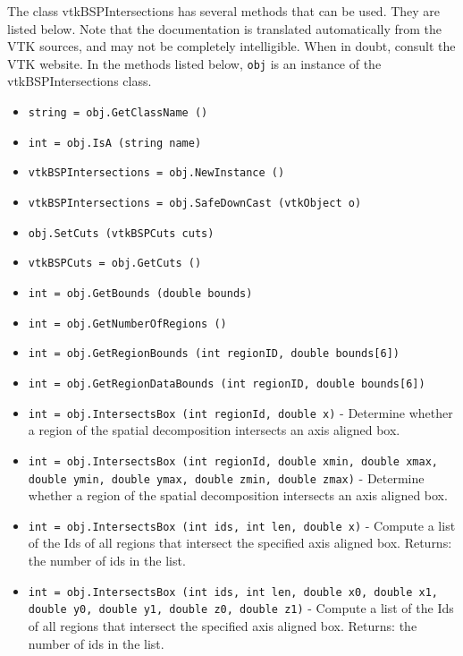 The class vtkBSPIntersections has several methods that can be used.
  They are listed below.
Note that the documentation is translated automatically from the VTK sources,
and may not be completely intelligible.  When in doubt, consult the VTK website.
In the methods listed below, \verb|obj| is an instance of the vtkBSPIntersections class.
\begin{itemize}
\item  \verb|string = obj.GetClassName ()|

\item  \verb|int = obj.IsA (string name)|

\item  \verb|vtkBSPIntersections = obj.NewInstance ()|

\item  \verb|vtkBSPIntersections = obj.SafeDownCast (vtkObject o)|

\item  \verb|obj.SetCuts (vtkBSPCuts cuts)|

\item  \verb|vtkBSPCuts = obj.GetCuts ()|

\item  \verb|int = obj.GetBounds (double bounds)|

\item  \verb|int = obj.GetNumberOfRegions ()|

\item  \verb|int = obj.GetRegionBounds (int regionID, double bounds[6])|

\item  \verb|int = obj.GetRegionDataBounds (int regionID, double bounds[6])|

\item  \verb|int = obj.IntersectsBox (int regionId, double x)| -     Determine whether a region of the spatial decomposition 
    intersects an axis aligned box.

\item  \verb|int = obj.IntersectsBox (int regionId, double xmin, double xmax, double ymin, double ymax, double zmin, double zmax)| -     Determine whether a region of the spatial decomposition 
    intersects an axis aligned box.

\item  \verb|int = obj.IntersectsBox (int ids, int len, double x)| -     Compute a list of the Ids of all regions that 
    intersect the specified axis aligned box.
    Returns: the number of ids in the list.

\item  \verb|int = obj.IntersectsBox (int ids, int len, double x0, double x1, double y0, double y1, double z0, double z1)| -     Compute a list of the Ids of all regions that 
    intersect the specified axis aligned box.
    Returns: the number of ids in the list.


\end{itemize}
